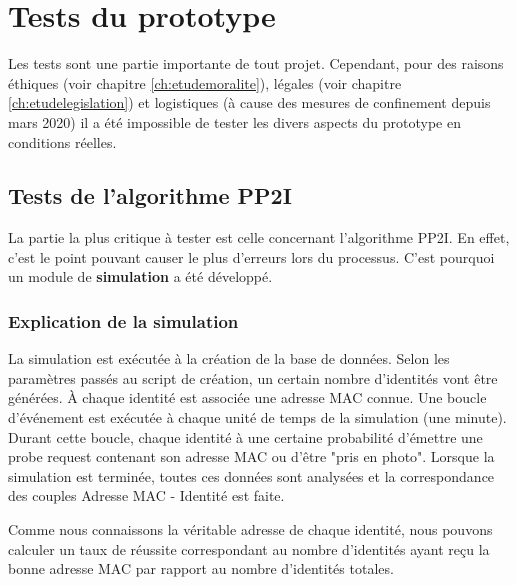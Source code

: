 \chapter{Tests du prototype}
\label{ch:test}

Les tests sont une partie importante de tout projet.
Cependant, pour des raisons éthiques (voir chapitre \ref{ch:etudemoralite}), légales (voir chapitre \ref{ch:etudelegislation}) et logistiques (à cause des mesures de confinement depuis mars 2020)
il a été impossible de tester les divers aspects du prototype en conditions réelles.

\section{Tests de l'algorithme PP2I}
La partie la plus critique à tester est celle concernant l'algorithme PP2I. 
En effet, c'est le point pouvant causer le plus d'erreurs lors du processus.
C'est pourquoi un module de \textbf{simulation} a été développé. 

\subsection{Explication de la simulation}
La simulation est exécutée à la création de la base de données.
Selon les paramètres passés au script de création, un certain nombre d'identités vont être générées. 
À chaque identité est associée une adresse MAC connue. 
Une boucle d'événement est exécutée à chaque unité de temps de la simulation (une minute).  
Durant cette boucle, chaque identité à une certaine probabilité d'émettre une probe request contenant son adresse MAC ou 
d'être "pris en photo". Lorsque la simulation est terminée, toutes ces données sont analysées et la correspondance des couples Adresse MAC - Identité est faite. 

Comme nous connaissons la véritable adresse de chaque identité, nous pouvons calculer un taux de réussite correspondant au nombre d'identités ayant reçu la bonne adresse MAC par rapport au nombre d'identités totales.

